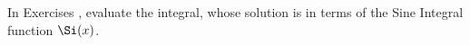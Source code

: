 {\noindent In Exercises}
{, evaluate the integral, whose solution is in terms of the Sine Integral function $\Si(x)$.
}
